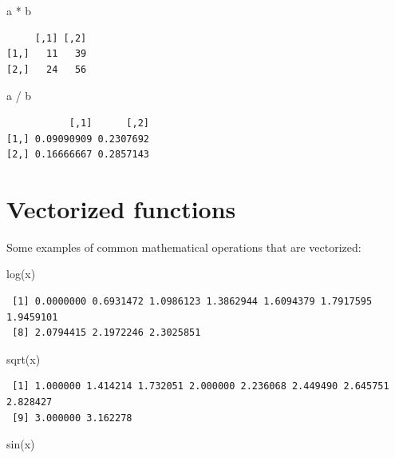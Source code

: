 \documentclass[
]{book}
\newenvironment{Shaded}{\begin{snugshade}}{\end{snugshade}}
\newcommand{\FunctionTok}[1]{\textcolor[rgb]{0.00,0.00,0.00}{#1}}
\newcommand{\NormalTok}[1]{#1}
\newcommand{\SpecialCharTok}[1]{\textcolor[rgb]{0.00,0.00,0.00}{#1}}
\begin{document}
\begin{Shaded}
\begin{Highlighting}[]
\NormalTok{a }\SpecialCharTok{*}\NormalTok{ b}
\end{Highlighting}
\end{Shaded}

\begin{verbatim}
     [,1] [,2]
[1,]   11   39
[2,]   24   56
\end{verbatim}

\begin{Shaded}
\begin{Highlighting}[]
\NormalTok{a }\SpecialCharTok{/}\NormalTok{ b}
\end{Highlighting}
\end{Shaded}

\begin{verbatim}
           [,1]      [,2]
[1,] 0.09090909 0.2307692
[2,] 0.16666667 0.2857143
\end{verbatim}

\hypertarget{vectorized-functions}{%
\section{Vectorized functions}\label{vectorized-functions}}

Some examples of common mathematical operations that are vectorized:

\begin{Shaded}
\begin{Highlighting}[]
\FunctionTok{log}\NormalTok{(x)}
\end{Highlighting}
\end{Shaded}

\begin{verbatim}
 [1] 0.0000000 0.6931472 1.0986123 1.3862944 1.6094379 1.7917595 1.9459101
 [8] 2.0794415 2.1972246 2.3025851
\end{verbatim}

\begin{Shaded}
\begin{Highlighting}[]
\FunctionTok{sqrt}\NormalTok{(x)}
\end{Highlighting}
\end{Shaded}

\begin{verbatim}
 [1] 1.000000 1.414214 1.732051 2.000000 2.236068 2.449490 2.645751 2.828427
 [9] 3.000000 3.162278
\end{verbatim}

\begin{Shaded}
\begin{Highlighting}[]
\FunctionTok{sin}\NormalTok{(x)}
\end{Highlighting}
\end{Shaded}
\end{document}
